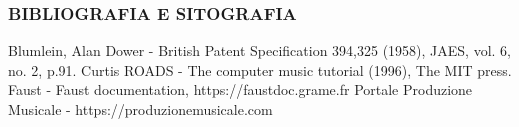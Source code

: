 \documentclass[
	a4paper,
	twocolumn
	]{article}
\begin{document}
\subsubsection*{BIBLIOGRAFIA E SITOGRAFIA}

Blumlein, Alan Dower - British Patent Specification 394,325 (1958), JAES, vol. 6, no. 2, p.91.
Curtis ROADS - The computer music tutorial (1996), The MIT press.
Faust - Faust documentation, https://faustdoc.grame.fr
Portale Produzione Musicale - https://produzionemusicale.com


%
%
%
%
\end{document}
